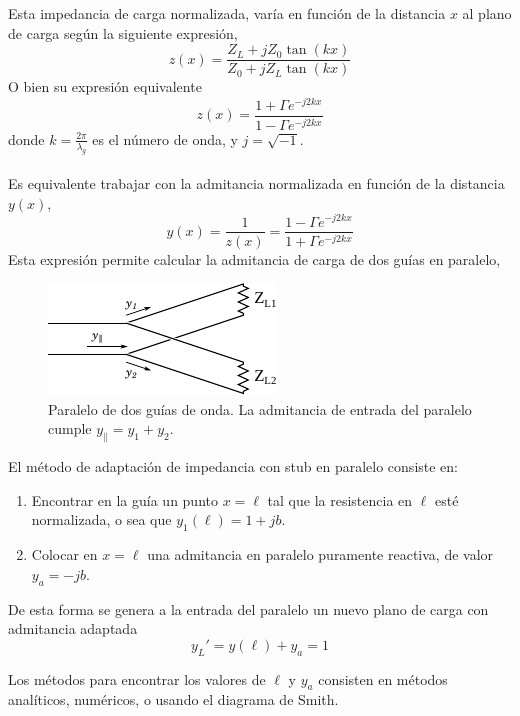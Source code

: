 \documentclass[11pt,a4paper]{article}
\begin{document}
\begin{multicols}{2}
Esta impedancia de carga normalizada, varía en función de la distancia $x$ al plano de carga según la siguiente expresión,
\begin{equation*}
    z(x) = \frac{Z_L + j Z_0\tan(kx)}{Z_0 + j Z_L\tan(kx)}
\end{equation*}
O bien su expresión equivalente
\begin{equation*}
    z(x) = \frac{1 + \Gamma e^{-j2kx}}{1 - \Gamma e^{-j2kx}}
\end{equation*}
donde $k=\frac{2\pi}{\lambda_g}$ es el número de onda, y $j=\sqrt{-1}$. \\ \\
Es equivalente trabajar con la admitancia normalizada en función de la distancia $y(x)$,
\begin{equation*}
    y(x) = \frac{1}{z(x)} = \frac{1 - \Gamma e^{-j2kx}}{1 + \Gamma e^{-j2kx}}
\end{equation*}
Esta expresión permite calcular la admitancia de carga de dos guías en paralelo,
\begin{figure}[H]
    \centering
    \includegraphics[width=0.7\linewidth]{Images/guiapll.pdf}
    \caption{Paralelo de dos guías de onda. La admitancia de entrada del paralelo cumple $y_\parallel = y_1+y_2$.}
    \label{fig:pll}
\end{figure}

El método de adaptación de impedancia con stub en paralelo consiste en:
\begin{enumerate}
    \item Encontrar en la guía un punto $x = \ell$ tal que la resistencia en $\ell$ esté normalizada, o sea que $y_1(\ell)=1+jb$.
    \item Colocar en $x=\ell$ una admitancia en paralelo puramente reactiva, de valor $y_a = -jb$.
\end{enumerate}

De esta forma se genera a la entrada del paralelo un nuevo plano de carga con admitancia adaptada 
$$y_L' = y(\ell) + y_a = 1$$

Los métodos para encontrar los valores de $\ell$ y $y_a$ consisten en métodos analíticos, numéricos, o usando el diagrama de Smith.



\end{multicols}
\end{document}
